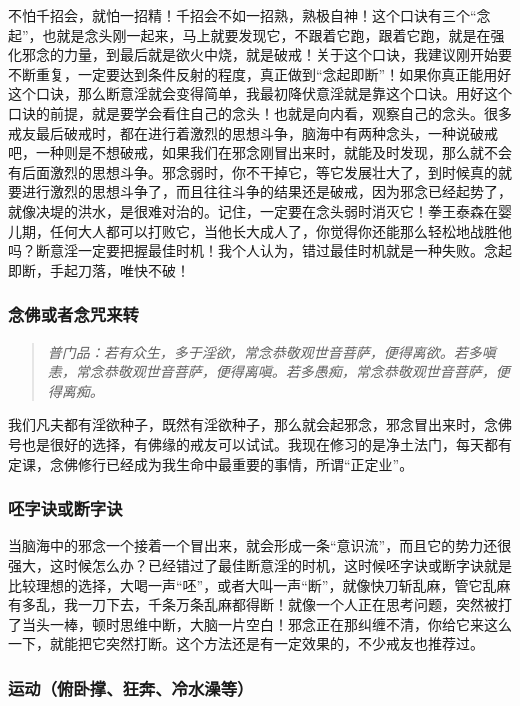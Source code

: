 不怕千招会，就怕一招精！千招会不如一招熟，熟极自神！这个口诀有三个“念起”，也就是念头刚一起来，马上就要发现它，不跟着它跑，跟着它跑，就是在强化邪念的力量，到最后就是欲火中烧，就是破戒！关于这个口诀，我建议刚开始要不断重复，一定要达到条件反射的程度，真正做到“念起即断”！如果你真正能用好这个口诀，那么断意淫就会变得简单，我最初降伏意淫就是靠这个口诀。用好这个口诀的前提，就是要学会看住自己的念头！也就是向内看，观察自己的念头。很多戒友最后破戒时，都在进行着激烈的思想斗争，脑海中有两种念头，一种说破戒吧，一种则是不想破戒，如果我们在邪念刚冒出来时，就能及时发现，那么就不会有后面激烈的思想斗争。邪念弱时，你不干掉它，等它发展壮大了，到时候真的就要进行激烈的思想斗争了，而且往往斗争的结果还是破戒，因为邪念已经起势了，就像决堤的洪水，是很难对治的。记住，一定要在念头弱时消灭它！拳王泰森在婴儿期，任何大人都可以打败它，当他长大成人了，你觉得你还能那么轻松地战胜他吗？断意淫一定要把握最佳时机！我个人认为，错过最佳时机就是一种失败。念起即断，手起刀落，唯快不破！

\subsubsection{念佛或者念咒来转}

\begin{quote}\it
    普门品：若有众生，多于淫欲，常念恭敬观世音菩萨，便得离欲。若多嗔恚，常念恭敬观世音菩萨，便得离嗔。若多愚痴，常念恭敬观世音菩萨，便得离痴。
\end{quote}

我们凡夫都有淫欲种子，既然有淫欲种子，那么就会起邪念，邪念冒出来时，念佛号也是很好的选择，有佛缘的戒友可以试试。我现在修习的是净土法门，每天都有定课，念佛修行已经成为我生命中最重要的事情，所谓“正定业”。


\subsubsection{呸字诀或断字诀}

当脑海中的邪念一个接着一个冒出来，就会形成一条“意识流”，而且它的势力还很强大，这时候怎么办？已经错过了最佳断意淫的时机，这时候呸字诀或断字诀就是比较理想的选择，大喝一声“呸”，或者大叫一声“断”，就像快刀斩乱麻，管它乱麻有多乱，我一刀下去，千条万条乱麻都得断！就像一个人正在思考问题，突然被打了当头一棒，顿时思维中断，大脑一片空白！邪念正在那纠缠不清，你给它来这么一下，就能把它突然打断。这个方法还是有一定效果的，不少戒友也推荐过。

\subsubsection{运动（俯卧撑、狂奔、冷水澡等）}

